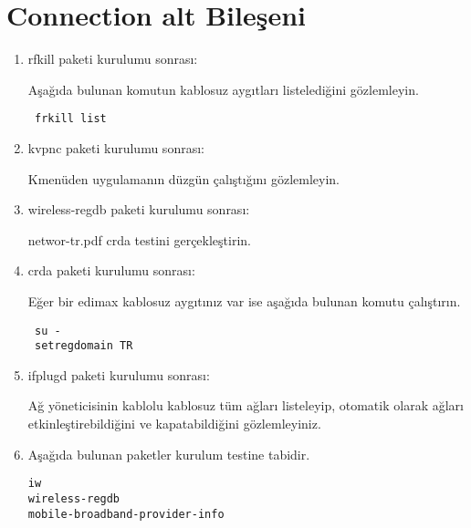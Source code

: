 \documentclass[a4paper,10pt]{article}
\begin{document}
\section{Connection alt Bileşeni}
\begin{enumerate}
\item rfkill paketi kurulumu sonrası:

Aşağıda bulunan komutun kablosuz aygıtları listelediğini gözlemleyin.
\begin{verbatim}
 frkill list
\end{verbatim}


\item kvpnc paketi kurulumu sonrası:

Kmenüden uygulamanın düzgün çalıştığını gözlemleyin.
\item wireless-regdb paketi kurulumu sonrası:

networ-tr.pdf crda testini gerçekleştirin.
\item crda paketi kurulumu sonrası:

Eğer bir edimax kablosuz aygıtınız var ise aşağıda bulunan komutu çalıştırın.
\begin{verbatim}
 su -
 setregdomain TR
\end{verbatim}

\item ifplugd paketi kurulumu sonrası:

Ağ yöneticisinin kablolu kablosuz tüm ağları listeleyip, otomatik olarak ağları etkinleştirebildiğini ve kapatabildiğini gözlemleyiniz.

 \item Aşağıda bulunan paketler kurulum testine tabidir.
\begin{verbatim}
iw
wireless-regdb
mobile-broadband-provider-info
\end{verbatim}

\end{enumerate}
\end{document}
